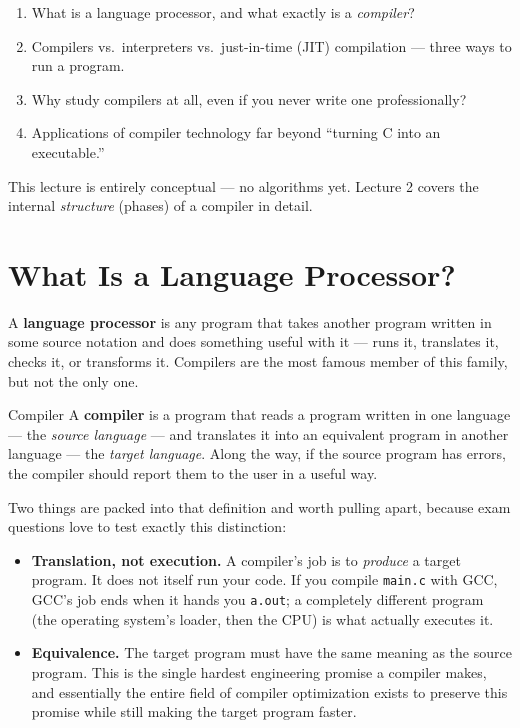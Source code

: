 \documentclass[11pt]{article}
\begin{document}
\makelecturetitle

\begin{coreidea}
\begin{enumerate}
  \item What is a language processor, and what exactly is a \emph{compiler}?
  \item Compilers vs.\ interpreters vs.\ just-in-time (JIT) compilation --- three ways to run a program.
  \item Why study compilers at all, even if you never write one professionally?
  \item Applications of compiler technology far beyond ``turning C into an executable.''
\end{enumerate}
This lecture is entirely conceptual --- no algorithms yet. Lecture 2 covers the internal
\emph{structure} (phases) of a compiler in detail.
\end{coreidea}

\section{What Is a Language Processor?}

\dbtag A \textbf{language processor} is any program that takes another program written in
some source notation and does something useful with it --- runs it, translates it, checks it,
or transforms it. Compilers are the most famous member of this family, but not the only one.

\begin{defbox}{Compiler}
A \textbf{compiler} is a program that reads a program written in one language --- the
\emph{source language} --- and translates it into an equivalent program in another language ---
the \emph{target language}. Along the way, if the source program has errors, the compiler
should report them to the user in a useful way.
\end{defbox}

Two things are packed into that definition and worth pulling apart, because exam questions love
to test exactly this distinction:

\begin{itemize}
  \item \textbf{Translation, not execution.} A compiler's job is to \emph{produce} a target
  program. It does not itself run your code. If you compile \texttt{main.c} with GCC, GCC's job
  ends when it hands you \texttt{a.out}; a completely different program (the operating system's
  loader, then the CPU) is what actually executes it.
  \item \textbf{Equivalence.} The target program must have the same meaning as the source
  program. This is the single hardest engineering promise a compiler makes, and essentially the
  entire field of compiler optimization exists to preserve this promise while still making the
  target program faster.
\end{itemize}
\end{document}

